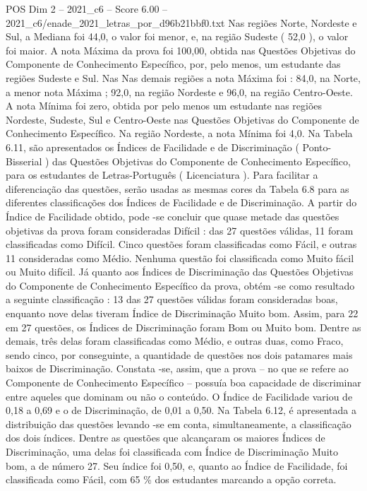 \begin{textsample}{POS Dim 2 – 2021\_c6 – Score 6.00 – 2021\_c6/enade\_2021\_letras\_por\_d96b21bbf0.txt}
Nas regiões Norte, Nordeste e Sul, a Mediana foi 44,0, o valor foi menor, e, na região Sudeste ( 52,0 ), o valor foi maior.
A nota Máxima da prova foi 100,00, obtida nas Questões Objetivas do Componente de Conhecimento Específico, por, pelo menos, um estudante das regiões Sudeste e Sul.
Nas Nas demais regiões a nota Máxima foi : 84,0, na Norte, a menor nota Máxima ; 92,0, na região Nordeste e 96,0, na região Centro-Oeste.
A nota Mínima foi zero, obtida por pelo menos um estudante nas regiões Nordeste, Sudeste, Sul e Centro-Oeste nas Questões Objetivas do Componente de Conhecimento Específico.
Na região Nordeste, a nota Mínima foi 4,0.
Na Tabela 6.11, são apresentados os Índices de Facilidade e de Discriminação ( Ponto-Bisserial ) das Questões Objetivas do Componente de Conhecimento Específico, para os estudantes de Letras-Português ( Licenciatura ).
Para facilitar a diferenciação das questões, serão usadas as mesmas cores da Tabela 6.8 para as diferentes classificações dos Índices de Facilidade e de Discriminação.
A partir do Índice de Facilidade obtido, pode -se concluir que quase metade das questões objetivas da prova foram consideradas Difícil : das 27 questões válidas, 11 foram classificadas como Difícil.
Cinco questões foram classificadas como Fácil, e outras 11 consideradas como Médio.
Nenhuma questão foi classificada como Muito fácil ou Muito difícil.
Já quanto aos Índices de Discriminação das Questões Objetivas do Componente de Conhecimento Específico da prova, obtém -se como resultado a seguinte classificação : 13 das 27 questões válidas foram consideradas boas, enquanto nove delas tiveram Índice de Discriminação Muito bom.
Assim, para 22 em 27 questões, os Índices de Discriminação foram Bom ou Muito bom.
Dentre as demais, três delas foram classificadas como Médio, e outras duas, como Fraco, sendo cinco, por conseguinte, a quantidade de questões nos dois patamares mais baixos de Discriminação.
Constata -se, assim, que a prova – no que se refere ao Componente de Conhecimento Específico – possuía boa capacidade de discriminar entre aqueles que dominam ou não o conteúdo.
O Índice de Facilidade variou de 0,18 a 0,69 e o de Discriminação, de 0,01 a 0,50.
Na Tabela 6.12, é apresentada a distribuição das questões levando -se em conta, simultaneamente, a classificação dos dois índices.
Dentre as questões que alcançaram os maiores Índices de Discriminação, uma delas foi classificada com Índice de Discriminação Muito bom, a de número 27.
Seu índice foi 0,50, e, quanto ao Índice de Facilidade, foi classificada como Fácil, com 65 \% dos estudantes marcando a opção correta.

\end{textsample}
